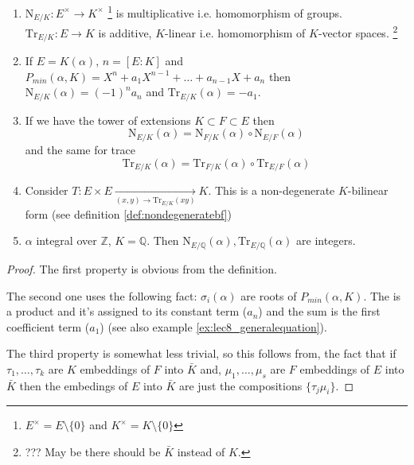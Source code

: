 \begin{property}
  \begin{enumerate}
  \item $\mathrm{N}_{E/K}: E^\times \to K^\times$
    \footnote{
      $E^\times = E \setminus \{0\}$ and
      $K^\times = K \setminus \{0\}$
    }
    is multiplicative
    i.e. homomorphism of groups.
    $\mathrm{Tr}_{E/K}: E \to K$ is additive, $K$-linear
    i.e. homomorphism of $K$-vector spaces.
    \footnote{
      ??? May be there should be $\bar{K}$ instead of $K$.
    }    
  \item If $E=K\left(\alpha\right)$, $n = \left[E:K\right]$ and
    $P_{min}\left(\alpha, K\right) = X^n + a_1 X^{n-1} + \dots +
    a_{n-1} X + a_{n}$ then $\mathrm{N}_{E/K}\left(\alpha\right) = (-1)^n
    a_n$ and $\mathrm{Tr}_{E/K}\left(\alpha\right) = -a_1$.
  \item If we have the tower of extensions $K \subset F \subset E$
    then
    \[
    \mathrm{N}_{E/K}\left(\alpha\right) =
    \mathrm{N}_{F/K}\left(\alpha\right) \circ
    \mathrm{N}_{E/F}\left(\alpha\right)
    \]
    and the same for trace
    \[
    \mathrm{Tr}_{E/K}\left(\alpha\right) =
    \mathrm{Tr}_{F/K}\left(\alpha\right) \circ
    \mathrm{Tr}_{E/F}\left(\alpha\right)
    \]
    \item Consider $T: E \times E \xrightarrow[(x, y) \to
      \mathrm{Tr}_{E/K}\left(xy\right)  ]{} K$. This is a
      non-degenerate $K$-bilinear form (see
      definition \ref{def:nondegeneratebf}) 
    \item $\alpha$ integral over $\mathbb{Z}$, $K = \mathbb{Q}$. Then
      $\mathrm{N}_{E/\mathbb{Q}}\left(\alpha\right),
      \mathrm{Tr}_{E/\mathbb{Q}}\left(\alpha\right)$ are integers.
  \end{enumerate}
  \begin{proof}
    The first property is obvious from the definition.

    The second one uses the following fact:
    $\sigma_i\left(\alpha\right)$ are roots of $P_{min}\left(\alpha,
    K\right)$. The  is a product and it's assigned
    to its constant term ($a_n$) and the sum is the first coefficient 
    term ($a_1$) (see also example \ref{ex:lec8_generalequation}).

    The third property is somewhat less trivial, so this follows from,
    the fact that if $\tau_1, \dots, \tau_k$ are $K$ embeddings of $F$
    into $\bar{K}$ and, $\mu_1, \dots, \mu_s$ are $F$ embeddings of
    $E$ into $\bar{K}$ then the embedings of $E$ into $\bar{K}$ are
    just the compositions $\{\tau_j \mu_i\}$.


\end{proof}
\end{property}
